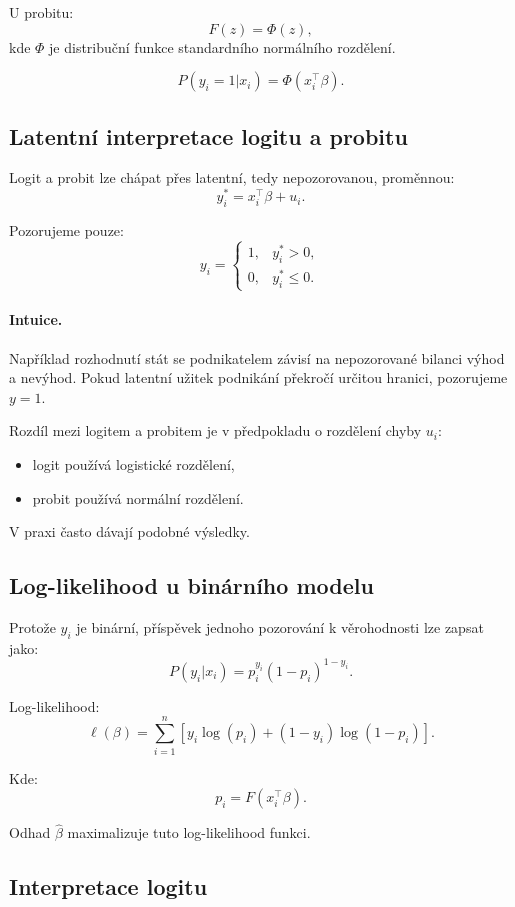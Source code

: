 U probitu:
\[
F(z)=\Phi(z),
\]
kde $\Phi$ je distribuční funkce standardního normálního rozdělení.

\[
P(y_i=1|x_i)=\Phi(x_i^\top\beta).
\]

\subsection{Latentní interpretace logitu a probitu}

Logit a probit lze chápat přes latentní, tedy nepozorovanou, proměnnou:
\[
y_i^*=x_i^\top\beta+u_i.
\]

Pozorujeme pouze:
\[
y_i=
\begin{cases}
1, & y_i^*>0,\\
0, & y_i^*\leq 0.
\end{cases}
\]

\paragraph{Intuice.}
Například rozhodnutí stát se podnikatelem závisí na nepozorované bilanci výhod a nevýhod.
Pokud latentní užitek podnikání překročí určitou hranici, pozorujeme $y=1$.

Rozdíl mezi logitem a probitem je v předpokladu o rozdělení chyby $u_i$:
\begin{itemize}
    \item logit používá logistické rozdělení,
    \item probit používá normální rozdělení.
\end{itemize}

V praxi často dávají podobné výsledky.

\subsection{Log-likelihood u binárního modelu}

Protože $y_i$ je binární, příspěvek jednoho pozorování k věrohodnosti lze zapsat jako:
\[
P(y_i|x_i)
=
p_i^{y_i}(1-p_i)^{1-y_i}.
\]

Log-likelihood:
\[
\ell(\beta)
=
\sum_{i=1}^n
\left[
y_i\log(p_i)+(1-y_i)\log(1-p_i)
\right].
\]

Kde:
\[
p_i=F(x_i^\top\beta).
\]

Odhad $\hat\beta$ maximalizuje tuto log-likelihood funkci.

\subsection{Interpretace logitu}

